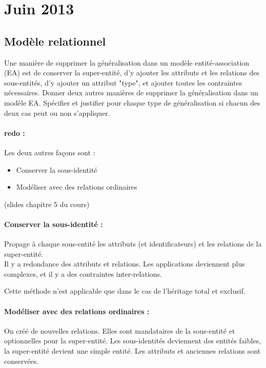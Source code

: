 \section{Juin 2013}

\subsection{Modèle relationnel}
Une manière de supprimer la généralisation dans un modèle entité-association (EA)
est de conserver la super-entité, d'y ajouter les attributs et les relations 
des sous-entités, d'y ajouter un attribut "type", et ajouter toutes les 
contraintes nécessaires. Donner deux autres manières de supprimer la 
généralisation dans un modèle EA. Spécifier et justifier pour chaque type de généralisation 
si chacun des deux cas peut ou non s'appliquer. 

\paragraph{redo :}
Les deux autres façons sont : 
\begin{itemize}
	\item Conserver la sous-identité 
	\item Modéliser avec des relations ordinaires
\end{itemize}
(slides chapitre 5 du cours)
\paragraph{Conserver la sous-identité :} Propage à chaque sous-entité les attributs 
(et identificateurs) et les relations de la super-entité.\\
Il y a redondance des attributs et relations. Les applications deviennent plus 
complexes, et il y a des contraintes inter-relations.

Cette méthode n'est applicable que dans le cas de l'héritage total et exclusif.

\paragraph{Modéliser avec des relations ordinaires :}
On créé de nouvelles relations. Elles sont mandataires de la sous-entité et 
optionnelles pour la super-entité.
Les sous-identités deviennent des entités faibles, la super-entité devient 
une simple entité.
Les attributs et anciennes relations sont conservées.\\

